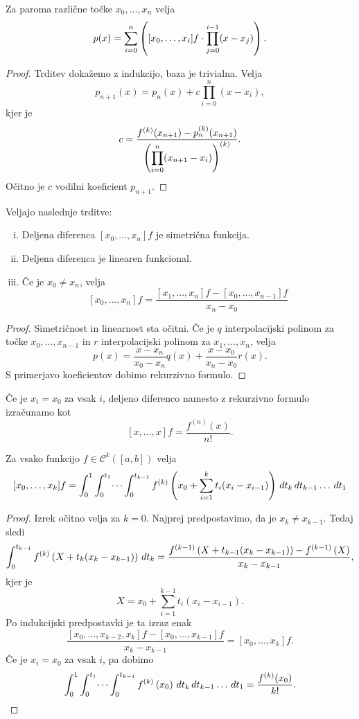 \begin{izrek}
Za paroma različne točke $x_0, \dots, x_n$ velja
\[
p(x) = \sum_{i=0}^n
\left([x_0, \dots, x_i]f \cdot \prod_{j=0}^{i-1} (x - x_j)\right).
\]
\end{izrek}

\begin{proof}
Trditev dokažemo z indukcijo, baza je trivialna. Velja
\[
p_{n+1}(x) = p_n(x) + c \prod_{i=0}^n (x - x_i),
\]
kjer je
\[
c =
\frac{f^{(k)}(x_{n+1}) - p_n^{(k)}(x_{n+1})}
{\left(\displaystyle \prod_{i=0}^n (x_{n+1} - x_i)\right)^{(k)}}.
\]
Očitno je $c$ vodilni koeficient $p_{n+1}$.
\end{proof}

\begin{izrek}
Veljajo naslednje trditve:

\begin{enumerate}[i)]
\item Deljena diferenca $[x_0, \dots, x_n] f$ je simetrična
funkcija.
\item Deljena diferenca je linearen funkcional.
\item Če je $x_0 \ne x_n$, velja
\[
[x_0, \dots, x_n] f =
\frac{[x_1, \dots, x_n] f - [x_0, \dots, x_{n-1}] f}{x_n - x_0}
\]
\end{enumerate}
\end{izrek}

\begin{proof}
Simetričnost in linearnost sta očitni. Če je $q$ interpolacijski
polinom za točke $x_0, \dots, x_{n-1}$ in $r$ interpolacijski
polinom za $x_1, \dots, x_n$, velja
\[
p(x) =
\frac{x - x_n}{x_0 - x_n} q(x) + \frac{x - x_0}{x_n - x_0} r(x).
\]
S primerjavo koeficientov dobimo rekurzivno formulo.
\end{proof}

\begin{opomba}
Če je $x_i = x_0$ za vsak $i$, deljeno diferenco namesto z
rekurzivno formulo izračunamo kot
\[
[x,\dots,x] f = \frac{f^{(n)}(x)}{n!}.
\]
\end{opomba}

\begin{izrek}
Za vsako funkcijo $f \in \mathcal{C}^k([a,b])$ velja
\[
[x_0, \dots, x_k] f =
\int_0^1 \int_0^{t_1} \dots \int_0^{t_{k-1}}
f^{(k)} \left(x_0 + \sum_{i=1}^k t_i (x_i - x_{i-1})\right)
\,dt_k \,dt_{k-1}\dots\,dt_1
\]
\end{izrek}

\begin{proof}
Izrek očitno velja za $k = 0$. Najprej predpostavimo, da je
$x_k \ne x_{k-1}$. Tedaj sledi
\[
\int_0^{t_{k-1}} f^{(k)}
\left(X + t_k (x_k - x_{k-1})\right)\,dt_k
\\
=
\frac{f^{(k-1)} \left(X + t_{k-1} (x_k - x_{k-1})\right) -
f^{(k-1)} \left(X\right)}{x_k - x_{k-1}},
\]
kjer je
\[
X = x_0 + \sum_{i=1}^{k-1} t_i (x_i - x_{i-1}).
\]
Po indukcijski predpostavki je ta izraz enak
\[
\frac{[x_0, \dots, x_{k-2}, x_k] f -
[x_0, \dots, x_{k-1}] f}{x_k - x_{k-1}} =
[x_0, \dots, x_k] f.
\]
Če je $x_i = x_0$ za vsak $i$, pa dobimo
\[
\int_0^1 \int_0^{t_1} \dots \int_0^{t_{k-1}}
f^{(k)} \left(x_0\right) \,dt_k \,dt_{k-1}\dots\,dt_1 =
\frac{f^{(k)}(x_0)}{k!}. \qedhere
\]
\end{proof}

